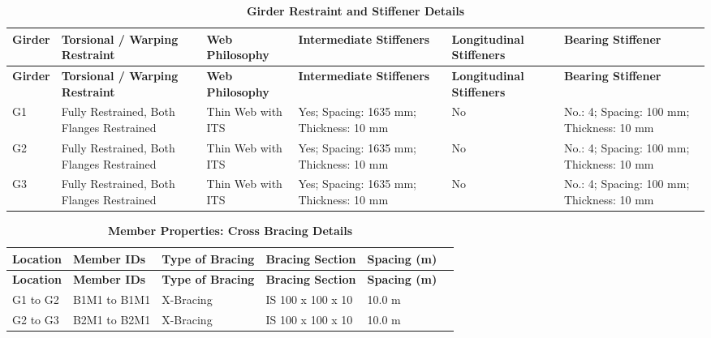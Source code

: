\documentclass[12pt,a4paper]{report}
\numberwithin{table}{chapter}
\numberwithin{figure}{chapter}
\begin{document}
\vspace{0.6em}

\vspace{4pt}
\begin{longtable}{|L{1.4cm}|L{2.2cm}|L{2.2cm}|L{3.0cm}|L{2.4cm}|L{2.2cm}|}
\caption{\textbf{Girder Restraint and Stiffener Details}}\\
\hline
\textbf{Girder} & \textbf{Torsional / Warping Restraint} & \textbf{Web Philosophy} & \textbf{Intermediate Stiffeners} & \textbf{Longitudinal Stiffeners} & \textbf{Bearing Stiffener} \\[6pt]
\hline
\endfirsthead

\hline
\textbf{Girder} & \textbf{Torsional / Warping Restraint} & \textbf{Web Philosophy} & \textbf{Intermediate Stiffeners} & \textbf{Longitudinal Stiffeners} & \textbf{Bearing Stiffener} \\[6pt]
\hline
\endhead
\hline
\endlastfoot

G1 & Fully Restrained, Both Flanges Restrained & Thin Web with ITS & Yes; Spacing: 1635 mm; Thickness: 10 mm & No & No.: 4; Spacing: 100 mm; Thickness: 10 mm \\[8pt]
\hline
G2 & Fully Restrained, Both Flanges Restrained & Thin Web with ITS & Yes; Spacing: 1635 mm; Thickness: 10 mm & No & No.: 4; Spacing: 100 mm; Thickness: 10 mm \\[8pt]
\hline
G3 & Fully Restrained, Both Flanges Restrained & Thin Web with ITS & Yes; Spacing: 1635 mm; Thickness: 10 mm & No & No.: 4; Spacing: 100 mm; Thickness: 10 mm \\[8pt]
\end{longtable}



\newpage

\vspace{0.4em}
\setlength{\tabcolsep}{4pt}
\setlength\LTleft{0pt}
\setlength\LTright{\fill}

\begin{longtable}{|L{2.2cm}|L{2.2cm}|L{3.0cm}|L{2.5cm}|C{1.8cm}|C{1.8cm}|}
\caption{\textbf{Member Properties: Cross Bracing Details}}\\
\hline
\textbf{Location} & \textbf{Member IDs} & \textbf{Type of Bracing} & \textbf{Bracing Section} & \textbf{Spacing (m)} \\
\hline
\endfirsthead

\hline
\textbf{Location} & \textbf{Member IDs} & \textbf{Type of Bracing} & \textbf{Bracing Section} & \textbf{Spacing (m)} \\
\hline
\endhead
\hline
\endlastfoot
G1 to G2 & B1M1 to B1M1 & X-Bracing & IS 100 x 100 x 10 & 10.0 m \\[6pt]
\hline
G2 to G3 & B2M1 to B2M1 & X-Bracing & IS 100 x 100 x 10 & 10.0 m \\[6pt]
\end{longtable}
\end{document}
